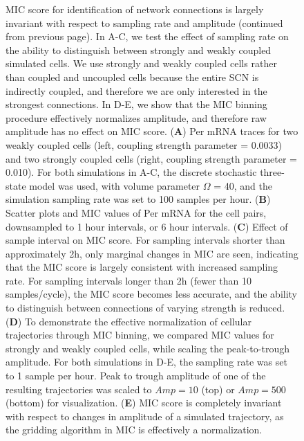 \begin{figure}[p]
    \caption{\label{fig:s2} 
    MIC score for identification of network connections is largely invariant with respect to sampling rate and amplitude (continued from previous page).
In A-C, we test the effect of sampling rate on the ability to distinguish between strongly and weakly coupled simulated cells.
We use strongly and weakly coupled cells rather than coupled and uncoupled cells because the entire SCN is indirectly coupled, and therefore we are only interested in the strongest connections.
In D-E, we show that the MIC binning procedure effectively normalizes amplitude, and therefore raw amplitude has no effect on MIC score.
(\textbf{A}) Per mRNA traces for two weakly coupled cells (left, coupling strength parameter = 0.0033) and two strongly coupled cells (right, coupling strength parameter = 0.010). For both simulations in A-C, the discrete stochastic three-state model \cite{Schroder2012} was used, with volume parameter $\Omega$ = 40, and the simulation sampling rate was set to 100 samples per hour.
(\textbf{B}) Scatter plots and MIC values of Per mRNA for the cell pairs, downsampled to 1 hour intervals, or 6 hour intervals.
(\textbf{C}) Effect of sample interval on MIC score. For sampling intervals shorter than approximately 2h, only marginal changes in MIC are seen, indicating that the MIC score is largely consistent with increased sampling rate.
For sampling intervals longer than 2h (fewer than 10 samples/cycle), the MIC score becomes less accurate, and the ability to distinguish between connections of varying strength is reduced.
(\textbf{D}) To demonstrate the effective normalization of cellular trajectories through MIC binning, we compared MIC values for strongly and weakly coupled cells, while scaling the peak-to-trough amplitude.
    For both simulations in D-E, the sampling rate was set to 1 sample per hour. Peak to trough amplitude of one of the resulting trajectories was scaled to $Amp = 10$ (top) or $Amp = 500$ (bottom) for visualization.
    (\textbf{E}) MIC score is completely invariant with respect to changes in amplitude of a simulated trajectory, as the gridding algorithm in MIC is effectively a normalization.
}
\end{figure}
